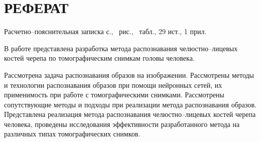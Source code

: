 \section*{РЕФЕРАТ}

Расчетно--пояснительная записка \pageref{LastPage} с., \totalfigures\ рис., \totaltables\ табл., 29 ист., 1 прил.

В работе представлена разработка метода распознавания челюстно--лицевых костей черепа по томографическим снимкам головы человека.

Рассмотрена задача распознавания образов на изображении. Рассмотрены методы и технологии распознавания образов при помощи нейронных сетей, их применимость при работе с томографическими снимками. Рассмотрены сопутствующие методы и подходы при реализации метода распознавания образов. Представлена реализация метода распознавания челюстно--лицевых костей черепа человека, проведены исследования эффективности разработанного метода на различных типах томографических снимков.